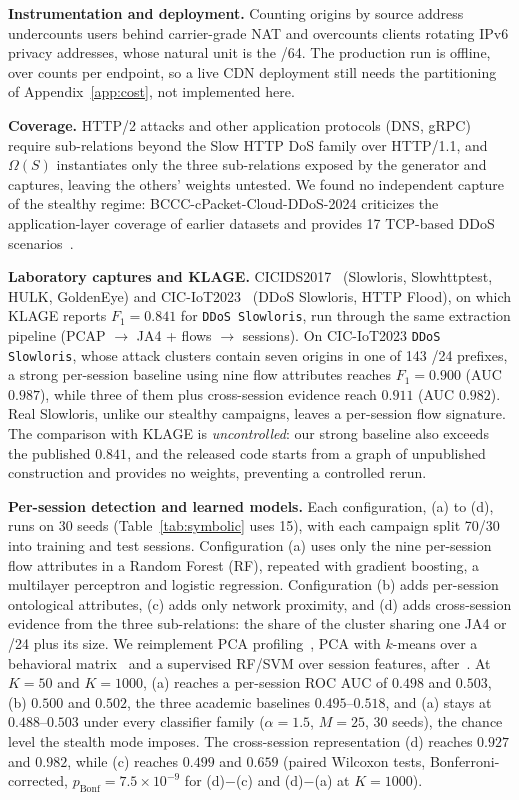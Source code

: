 \documentclass[conference,letterpaper,10pt]{IEEEtran}
\newcommand\1{\textit{(i)}}
\newcommand\2{\textit{(ii)}}
\newcommand\3{\textit{(iii)}}
\newcommand\4{\textit{(iv)}}
\newcommand\5{\textit{(v)}}
\newcommand\6{\textit{(vi)}}
\newcommand\7{\textit{(vii)}}
\newcommand\8{\textit{(viii)}}
\newcommand\9{\textit{(ix)}}
\begin{document}
\textbf{Instrumentation and deployment.} Counting origins by source address undercounts users behind carrier-grade NAT and overcounts clients rotating IPv6 privacy addresses, whose natural unit is the /64. The production run is offline, over counts per endpoint, so a live CDN deployment still needs the partitioning of Appendix~\ref{app:cost}, not implemented here.

\textbf{Coverage.} HTTP/2 attacks and other application protocols (DNS, gRPC) require sub-relations beyond the Slow HTTP DoS family over HTTP/1.1, and $\Omega(S)$ instantiates only the three sub-relations exposed by the generator and captures, leaving the others' weights untested. We found no independent capture of the stealthy regime: BCCC-cPacket-Cloud-DDoS-2024 criticizes the application-layer coverage of earlier datasets and provides 17 TCP-based DDoS scenarios~\cite{shafi2024bccc}.


\textbf{Laboratory captures and KLAGE.} CICIDS2017~\cite{sharafaldin2018cicids} (Slowloris, Slowhttptest, HULK, GoldenEye) and CIC-IoT2023~\cite{neto2023ciciot} (DDoS Slowloris, HTTP Flood), on which KLAGE reports $F_1 = 0.841$ for \texttt{DDoS Slowloris}, run through the same extraction pipeline (PCAP $\rightarrow$ JA4 + flows $\rightarrow$ sessions). On CIC-IoT2023 \texttt{DDoS Slowloris}, whose attack clusters contain seven origins in one of 143 /24 prefixes, a strong per-session baseline using nine flow attributes reaches $F_1 = 0.900$ (AUC $0.987$), while three of them plus cross-session evidence reach $0.911$ (AUC $0.982$). Real Slowloris, unlike our stealthy campaigns, leaves a per-session flow signature. The comparison with KLAGE is \textit{uncontrolled}: our strong baseline also exceeds the published $0.841$, and the released code starts from a graph of unpublished construction and provides no weights, preventing a controlled rerun.

\textbf{Per-session detection and learned models.} Each configuration, (a) to (d), runs on 30 seeds (Table~\ref{tab:symbolic} uses 15), with each campaign split 70/30 into training and test sessions. Configuration (a) uses only the nine per-session flow attributes in a Random Forest (RF), repeated with gradient boosting, a multilayer perceptron and logistic regression. Configuration (b) adds per-session ontological attributes, (c) adds only network proximity, and (d) adds cross-session evidence from the three sub-relations: the share of the cluster sharing one JA4 or /24 plus its size. We reimplement PCA profiling~\cite{fernandes2015autonomous}, PCA with $k$-means over a behavioral matrix~\cite{bharathi2012pca} and a supervised RF/SVM over session features, after~\cite{kemp2023approach}. At $K = 50$ and $K = 1000$, (a) reaches a per-session ROC AUC of $0.498$ and $0.503$, (b) $0.500$ and $0.502$, the three academic baselines $0.495$--$0.518$, and (a) stays at $0.488$--$0.503$ under every classifier family ($\alpha = 1.5$, $M = 25$, 30 seeds), the chance level the stealth mode imposes. The cross-session representation (d) reaches $0.927$ and $0.982$, while (c) reaches $0.499$ and $0.659$ (paired Wilcoxon tests, Bonferroni-corrected, $p_{\mathrm{Bonf}} = 7.5\times 10^{-9}$ for (d)$-$(c) and (d)$-$(a) at $K = 1000$).
\end{document}
